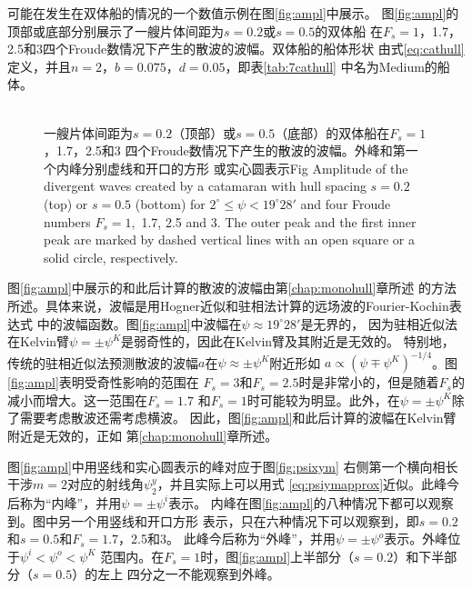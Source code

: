 可能在发生在双体船的情况的一个数值示例在图\ref{fig:ampl}中展示。
图\ref{fig:ampl}的顶部或底部分别展示了一艘片体间距为$s=0.2$或$s=0.5$的双体船
在$F_s=1$，1.7，2.5和3四个Froude数情况下产生的散波的波幅。双体船的船体形状
由式\eqref{eq:cathull}定义，并且$n=2$，$b=0.075$，$d=0.05$，即表\ref{tab:7cathull}
中名为Medium的船体。
%
\begin{figure}
\centering
{}\\
 {一艘片体间距为$s=0.2$（顶部）或$s=0.5$（底部）的双体船在$F_s=1$，1.7，2.5和3
 四个Froude数情况下产生的散波的波幅。外峰和第一个内峰分别虚线和开口的方形
 或实心圆表示}{Fig}
 {Amplitude of the divergent waves created by a catamaran with hull spacing $s=0.2$ (top) or $s=0.5$ 
 (bottom) for $2^\circ\!\leq\psi<19^\circ28'$ and four Froude numbers $F_s=1,$ 1.7, 2.5 and 3\hspace{0.05em}.  The outer 
 peak and the first inner peak are marked by dashed vertical lines with an open square or a solid circle, respectively.}
\end{figure}
%

图\ref{fig:ampl}中展示的和此后计算的散波的波幅由第\ref{chap:monohull}章所述
的方法所述。具体来说，波幅是用Hogner近似和驻相法计算的远场波的Fourier-Kochin表达式
中的波幅函数。图\ref{fig:ampl}中波幅在$\psi\approx19^\circ28'$是无界的，
因为驻相近似法在Kelvin臂$\psi=\pm\psi^K$是弱奇性的，因此在Kelvin臂及其附近是无效的。
特别地，传统的驻相近似法预测散波的波幅$a$在$\psi\approx\pm\psi^K$附近形如
$a\propto(\psi\mp\psi^K)^{-1/4}$。图\ref{fig:ampl}表明受奇性影响的范围在
$F_s=3$和$F_s=2.5$时是非常小的，但是随着$F_s$的减小而增大。这一范围在$F_s=1.7$
和$F_s=1$时可能较为明显。此外，在$\psi=\pm\psi^K$除了需要考虑散波还需考虑横波。
因此，图\ref{fig:ampl}和此后计算的波幅在Kelvin臂附近是无效的，正如
第\ref{chap:monohull}章所述。

图\ref{fig:ampl}中用竖线和实心圆表示的峰对应于图\ref{fig:psixym}
右侧第一个横向相长干涉$m=2$对应的射线角$\psi_2^y$，并且实际上可以用式
\eqref{eq:psiymapprox}近似。此峰今后称为``内峰''，并用$\psi=\pm\psi^i$表示。
内峰在图\ref{fig:ampl}的八种情况下都可以观察到。图中另一个用竖线和开口方形
表示，只在六种情况下可以观察到，即$s=0.2$和$s=0.5$和$F_s=1.7$，2.5和3。
此峰今后称为``外峰''，并用$\psi=\pm\psi^o$表示。外峰位于$\psi^i<\psi^o<\psi^K$
范围内。在$F_s=1$时，图\ref{fig:ampl}上半部分（$s=0.2$）和下半部分（$s=0.5$）的左上
四分之一不能观察到外峰。

